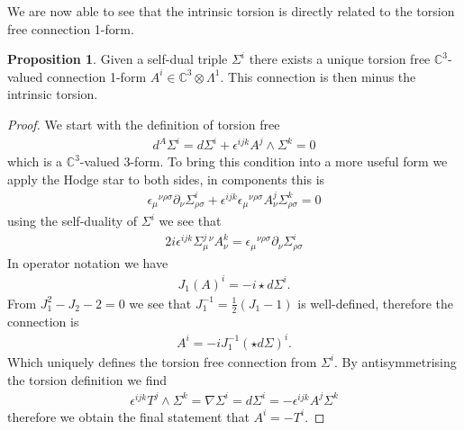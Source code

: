 \documentclass[10pt]{report}
\theoremstyle{definition}
\newtheorem{proposition}{Proposition}[chapter]
\newcommand{\C}[0]{\mathbb{C}}
\newcommand{\E}[0]{\C^3}
\begin{document}
We are now able to see that the intrinsic torsion is directly related to the torsion free connection 1-form.
\begin{proposition}
    Given a self-dual triple $\Sigma^i$ there exists a unique torsion free $\E$-valued connection 1-form $A^i \in \E \otimes \Lambda^1$. This connection is then minus the intrinsic torsion.
\end{proposition}
\begin{proof} \label{eq:plebanski-unique-intrinsic-torsion-proof}
    We start with the definition of torsion free
    \begin{align}
        d^A \Sigma^i = d\Sigma^i + \epsilon^{ijk} A^j \wedge \Sigma^k = 0
    \end{align}
    which is a $\E$-valued 3-form. To bring this condition into a more useful form we apply the Hodge star to both sides, in components this is 
    \begin{align}
        \epsilon_\mu{}^{\nu\rho\sigma} \partial_\nu \Sigma^i_{\rho\sigma} + \epsilon^{ijk} \epsilon_\mu{}^{\nu\rho\sigma} A^j_\nu \Sigma^k_{\rho\sigma} = 0
    \end{align}
    using the self-duality of $\Sigma^i$ we see that
    \begin{align}
        2i \epsilon^{ijk} \Sigma^j_\mu{}^\nu A^k_\nu = \epsilon_\mu{}^{\nu\rho\sigma} \partial_\nu \Sigma^i_{\rho\sigma} 
    \end{align}
    In operator notation we have 
    \begin{align}
        J_1(A)^i = -i \star d\Sigma^i.
    \end{align}
    From $J_1^2 - J_2 -2 = 0$ we see that $J_1^{-1} = \frac{1}{2}(J_1 - 1)$ is well-defined, therefore the connection is 
    \begin{align}
        A^i = -i J_1^{-1}(\star d\Sigma)^i.
    \end{align}
    Which uniquely defines the torsion free connection from $\Sigma^i$. By antisymmetrising the torsion definition we find 
    \begin{align}
        \epsilon^{ijk} T^j \wedge \Sigma^k = \nabla \Sigma^i = d \Sigma^i = - \epsilon^{ijk} A^j \Sigma^k
    \end{align}
    therefore we obtain the final statement that $A^i = -T^i$.
\end{proof}
\end{document}
